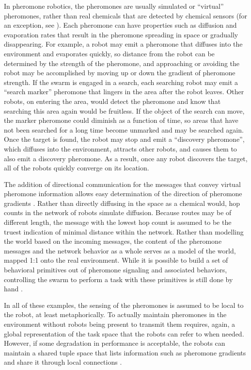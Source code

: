 In pheromone robotics, the pheromones are usually simulated or ``virtual'' pheromones, rather than real chemicals that are detected by chemical sensors (for an exception, see \citep{hayes2001swarm}). 
Each pheromone can have properties such as diffusion and evaporation rates that result in the pheromone spreading in space or gradually disappearing. 
For example, a robot may emit a pheromone that diffuses into the environment and evaporates quickly, so distance from the robot can be determined by the strength of the pheromone, and approaching or avoiding the robot may be accomplished by moving up or down the gradient of pheromone strength. 
If the swarm is engaged in a search, each searching robot may emit a ``search marker'' pheromone that lingers in the area after the robot leaves. 
Other robots, on entering the area, would detect the pheromone and know that searching this area again would be fruitless. 
If the object of the search can move, the marker pheromone could diminish as a function of time, so areas that have not been searched for a long time become unmarked and may be searched again. 
Once the target is found, the robot may stop and emit a ``discovery pheromone'', which diffuses into the environment, attracts other robots, and causes them to also emit a discovery pheromone. 
As a result, once any robot discovers the target, all of the robots quickly converge on its location. 

The addition of directional communication for the messages that convey virtual pheromone information allows easy determination of the direction of pheromone gradients \citep{payton2001pheromone}.
Rather than directly diffusing in the space as a chemical would, hop counts in the network of robots simulate diffusion. 
Because routes may be of different length, the message with the lowest hop count is assumed to be the truest indication of minimal distance within the network. 
Rather than modelling the world based on the incoming messages, the content of the pheromone messages and the network behavior as a whole serves as a model of the world, mapped 1:1 onto the real environment. 
While it is possible to build a set of behavioral primitives out of pheromone signaling and associated behaviors, controlling the swarm to perform a task with these primitives is still done by hand \citep{payton2003compound}.

In all of these examples, the sensing of the pheromones is assumed to be local to the robot, at least metaphorically. 
To actually maintain pheromones in the environment without robots being present to transmit them requires, again, a global representation of the task space that the robots can refer to when needed. 
However, if some degradation in performance is acceptable, the robots can maintain a shared tuple space that lists information such as pheromone gradients and share it through local connections \citep{pinciroli2016tuple}. 

